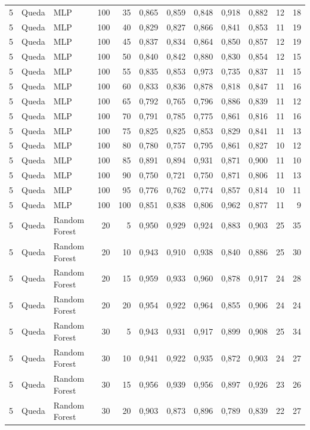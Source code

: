 \begin{longtable}{@{}rllrrrrrrrrr@{}}
5 & Queda & MLP & 100 & 35 & 0,865 & 0,859 & 0,848 & 0,918 & 0,882 & 12 & 18 \\
5 & Queda & MLP & 100 & 40 & 0,829 & 0,827 & 0,866 & 0,841 & 0,853 & 11 & 19 \\
5 & Queda & MLP & 100 & 45 & 0,837 & 0,834 & 0,864 & 0,850 & 0,857 & 12 & 19 \\
5 & Queda & MLP & 100 & 50 & 0,840 & 0,842 & 0,880 & 0,830 & 0,854 & 12 & 15 \\
5 & Queda & MLP & 100 & 55 & 0,835 & 0,853 & 0,973 & 0,735 & 0,837 & 11 & 15 \\
5 & Queda & MLP & 100 & 60 & 0,833 & 0,836 & 0,878 & 0,818 & 0,847 & 11 & 16 \\
5 & Queda & MLP & 100 & 65 & 0,792 & 0,765 & 0,796 & 0,886 & 0,839 & 11 & 12 \\
5 & Queda & MLP & 100 & 70 & 0,791 & 0,785 & 0,775 & 0,861 & 0,816 & 11 & 16 \\
5 & Queda & MLP & 100 & 75 & 0,825 & 0,825 & 0,853 & 0,829 & 0,841 & 11 & 13 \\
5 & Queda & MLP & 100 & 80 & 0,780 & 0,757 & 0,795 & 0,861 & 0,827 & 10 & 12 \\
5 & Queda & MLP & 100 & 85 & 0,891 & 0,894 & 0,931 & 0,871 & 0,900 & 11 & 10 \\
5 & Queda & MLP & 100 & 90 & 0,750 & 0,721 & 0,750 & 0,871 & 0,806 & 11 & 13 \\
5 & Queda & MLP & 100 & 95 & 0,776 & 0,762 & 0,774 & 0,857 & 0,814 & 10 & 11 \\
5 & Queda & MLP & 100 & 100 & 0,851 & 0,838 & 0,806 & 0,962 & 0,877 & 11 & 9 \\
5 & Queda & Random Forest & 20 & 5 & 0,950 & 0,929 & 0,924 & 0,883 & 0,903 & 25 & 35 \\
5 & Queda & Random Forest & 20 & 10 & 0,943 & 0,910 & 0,938 & 0,840 & 0,886 & 25 & 30 \\
5 & Queda & Random Forest & 20 & 15 & 0,959 & 0,933 & 0,960 & 0,878 & 0,917 & 24 & 28 \\
5 & Queda & Random Forest & 20 & 20 & 0,954 & 0,922 & 0,964 & 0,855 & 0,906 & 24 & 24 \\
5 & Queda & Random Forest & 30 & 5 & 0,943 & 0,931 & 0,917 & 0,899 & 0,908 & 25 & 34 \\
5 & Queda & Random Forest & 30 & 10 & 0,941 & 0,922 & 0,935 & 0,872 & 0,903 & 24 & 27 \\
5 & Queda & Random Forest & 30 & 15 & 0,956 & 0,939 & 0,956 & 0,897 & 0,926 & 23 & 26 \\
5 & Queda & Random Forest & 30 & 20 & 0,903 & 0,873 & 0,896 & 0,789 & 0,839 & 22 & 27 \\

\end{longtable}
